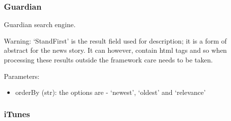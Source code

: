 \documentclass[letterpaper,10pt,english]{sphinxmanual}
\begin{document}
\subsubsection{Guardian}
\label{api2.0:guardian}

\begin{fulllineitems}
\label{api2.0:puppy.search.engine.Guardian}
Guardian search engine.

Warning: `StandFirst' is the result field used for description; it is a form of abstract for the news story.
It can however, contain html tags and so when processing these results outside the framework care needs to be
taken.

Parameters:
\begin{itemize}
\item {} 
orderBy (str): the options are - `newest', `oldest' and `relevance'

\end{itemize}

\end{fulllineitems}



\subsubsection{iTunes}
\label{api2.0:itunes}
\end{document}
